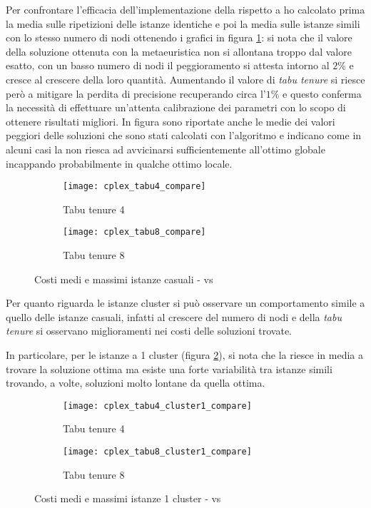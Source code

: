 Per confrontare l'efficacia dell'implementazione della \tabu rispetto a  ho calcolato prima la media sulle ripetizioni delle istanze identiche e poi la media sulle istanze simili con lo stesso numero di nodi ottenendo i grafici in figura \ref{fig:costi cplex tabu}: si nota che il valore della soluzione ottenuta con la metaeuristica non si allontana troppo dal valore esatto, con un basso numero di nodi il peggioramento si attesta intorno al $2\%$ e cresce al crescere della loro quantità.
Aumentando il valore di \emph{tabu tenure} si riesce però a mitigare la perdita di precisione recuperando circa l'$1\%$ e questo conferma la necessità di effettuare un'attenta calibrazione dei parametri con lo scopo di ottenere risultati migliori.
In figura sono riportate anche le medie dei valori peggiori delle soluzioni che sono stati calcolati con l'algoritmo e indicano come in alcuni casi la \tabu non riesca ad avvicinarsi sufficientemente all'ottimo globale incappando probabilmente in qualche ottimo locale.

\begin{figure}[H]
	\centering
	\begin{subfigure}[b]{.45\textwidth}
			\texttt{[image: cplex\_tabu4\_compare]}
			\caption{Tabu tenure 4}
	\end{subfigure}
	\quad
	\begin{subfigure}[b]{.45\textwidth}
			\texttt{[image: cplex\_tabu8\_compare]}
			\caption{Tabu tenure 8}
	\end{subfigure}
	\caption{Costi medi e massimi istanze casuali -  vs \tabu}
	\label{fig:costi cplex tabu}
\end{figure}

Per quanto riguarda le istanze cluster si può osservare un comportamento simile a quello delle istanze casuali, infatti al crescere del numero di nodi e della \emph{tabu tenure} si osservano miglioramenti nei costi delle soluzioni trovate.

In particolare, per le istanze a 1 cluster (figura \ref{fig:costi cplex tabu cluster 1}), si nota che la \tabu riesce in media a trovare la soluzione ottima ma esiste una forte variabilità tra istanze simili trovando, a volte, soluzioni molto lontane da quella ottima.

\begin{figure}[H]
	\centering
	\begin{subfigure}[b]{.45\textwidth}
			\texttt{[image: cplex\_tabu4\_cluster1\_compare]}
			\caption{Tabu tenure 4}
	\end{subfigure}
	\quad
	\begin{subfigure}[b]{.45\textwidth}
			\texttt{[image: cplex\_tabu8\_cluster1\_compare]}
			\caption{Tabu tenure 8}
	\end{subfigure}
	\caption{Costi medi e massimi istanze 1 cluster -  vs \tabu}
	\label{fig:costi cplex tabu cluster 1}
\end{figure}

